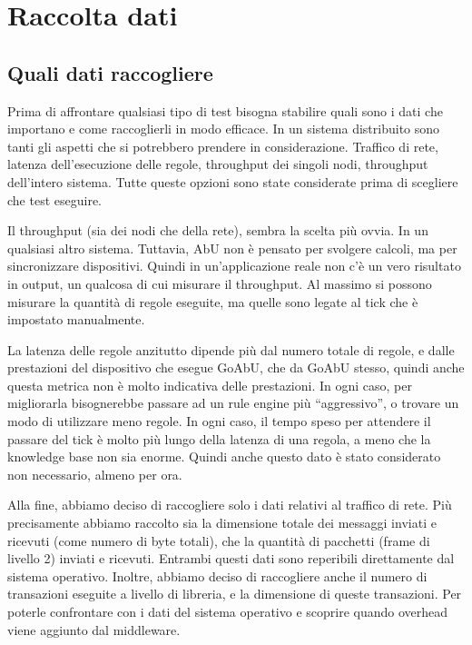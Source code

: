\documentclass[12pt, a4paper]{article}
\begin{document}
\section{Raccolta dati}

\subsection{Quali dati raccogliere}\label{raccolta:quali}

Prima di affrontare qualsiasi tipo di test bisogna stabilire quali sono i dati che importano e come raccoglierli in modo efficace.
In un sistema distribuito sono tanti gli aspetti che si potrebbero prendere in considerazione. Traffico di rete, latenza dell'esecuzione delle regole, throughput dei singoli nodi, throughput dell'intero sistema. Tutte queste opzioni sono state considerate prima di scegliere che test eseguire.

Il throughput (sia dei nodi che della rete), sembra la scelta più ovvia. In un qualsiasi altro sistema. Tuttavia, AbU non è pensato per svolgere calcoli, ma per sincronizzare dispositivi.
Quindi in un'applicazione reale non c'è un vero risultato in output, un qualcosa di cui misurare il throughput. Al massimo si possono misurare la quantità di regole eseguite, ma quelle sono legate al tick che è impostato manualmente.

La latenza delle regole anzitutto dipende più dal numero totale di regole, e dalle prestazioni del dispositivo che esegue GoAbU, che da GoAbU stesso, quindi anche questa metrica non è molto indicativa delle prestazioni.
In ogni caso, per migliorarla bisognerebbe passare ad un rule engine più ``aggressivo'', o trovare un modo di utilizzare meno regole.
In ogni caso, il tempo speso per attendere il passare del tick è molto più lungo della latenza di una regola, a meno che la knowledge base non sia enorme.
Quindi anche questo dato è stato considerato non necessario, almeno per ora.

Alla fine, abbiamo deciso di raccogliere solo i dati relativi al traffico di rete. Più precisamente abbiamo raccolto sia la dimensione totale dei messaggi inviati e ricevuti (come numero di byte totali), che la quantità di pacchetti (frame di livello 2) inviati e ricevuti. Entrambi questi dati sono reperibili direttamente dal sistema operativo.
Inoltre, abbiamo deciso di raccogliere anche il numero di transazioni eseguite a livello di libreria, e la dimensione di queste transazioni. Per poterle confrontare con i dati del sistema operativo e scoprire quando overhead viene aggiunto dal middleware.
\end{document}
